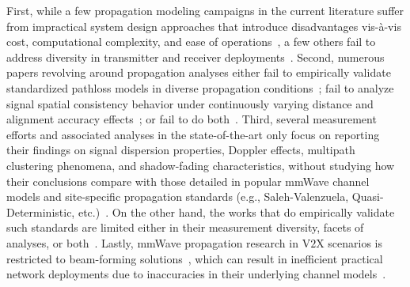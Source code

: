 \documentclass[10pt, twocolumn]{IEEEtran}
\begin{document}
First, while a few propagation modeling campaigns in the current literature suffer from impractical system design approaches that introduce disadvantages vis-\`{a}-vis cost, computational complexity, and ease of operations~\cite{Purdue, Foliage, AgileLink}, a few others fail to address diversity in transmitter and receiver deployments~\cite{Harvard, Indoor60G, MacCartneyRural}. Second, numerous papers revolving around propagation analyses either fail to empirically validate standardized pathloss models in diverse propagation conditions~\cite{SpatialConsistencyOriginal, MolischSpatialOutdoor, MacCartneySpatialStatistics}; fail to analyze signal spatial consistency behavior under continuously varying distance and alignment accuracy effects~\cite{Outdoor28G, Qualcomm3GPP, MacCartneyModelsOverview}; or fail to do both~\cite{Indoor60G, SuburbanGeometryJournal, FoliageSimulations}. Third, several measurement efforts and associated analyses in the state-of-the-art only focus on reporting their findings on signal dispersion properties, Doppler effects, multipath clustering phenomena, and shadow-fading characteristics, without studying how their conclusions compare with those detailed in popular mmWave channel models and site-specific propagation standards (e.g., Saleh-Valenzuela, Quasi-Deterministic, etc.)~\cite{PDAPs, DopplerHST, Outdoor28G, SpatialDynamics, V2XBlockages}. On the other hand, the works that do empirically validate such standards are limited either in their measurement diversity, facets of analyses, or both~\cite{Indoor60G, NISTModeling, QDC_NIST, D2DHumanBlockage}. Lastly, mmWave propagation research in V$2$X scenarios is restricted to beam-forming solutions~\cite{VehicularBeamSelection, CVBeamAlignmentV2X}, which can result in inefficient practical network deployments due to inaccuracies in their underlying channel models~\cite{MolischEstimate, IoV}.
\end{document}
